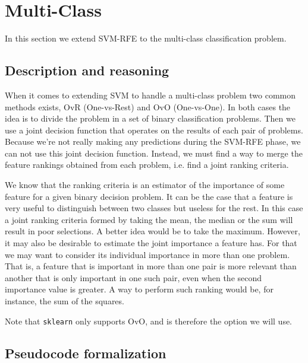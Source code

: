 \section{Multi-Class}

In this section we extend SVM-RFE to the multi-class classification problem.

\subsection{Description and reasoning}
\label{sec:stopCond.desc}

When it comes to extending SVM to handle a multi-class problem two common methods exists, OvR (One-vs-Rest) and OvO (One-vs-One). In both cases the idea is to divide the problem in a set of binary classification problems. Then we use a joint decision function that operates on the results of each pair of problems. Because we're not really making any predictions during the SVM-RFE phase, we can not use this joint decision function. Instead, we must find a way to merge the feature rankings obtained from each problem, i.e. find a joint ranking criteria.

We know that the ranking criteria is an estimator of the importance of some feature for a given binary decision problem. It can be the case that a feature is very useful to distinguish between two classes but useless for the rest. In this case a joint ranking criteria formed by taking the mean, the median or the sum will result in poor selections. A better idea would be to take the maximum. However, it may also be desirable to estimate the joint importance a feature has. For that we may want to consider its individual importance in more than one problem. That is, a feature that is important in more than one pair is more relevant than another that is only important in one such pair, even when the second importance value is greater. A way to perform such ranking would be, for instance, the sum of the squares.

Note that \texttt{sklearn} only supports OvO, and is therefore the option we will use.

\subsection{Pseudocode formalization}


